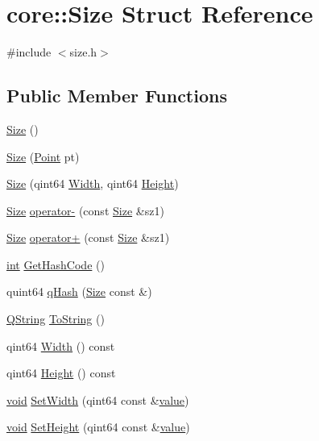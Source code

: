 \hypertarget{structcore_1_1_size}{\section{core\-:\-:Size Struct Reference}
\label{structcore_1_1_size}
}


{\ttfamily \#include $<$size.\-h$>$}

\subsection*{Public Member Functions}
\begin{DoxyCompactItemize}
\item 
\hyperlink{group___o_p_map_widget_gaf57b3247af9a9399f85615e6ad8a6981}{Size} ()
\item 
\hyperlink{group___o_p_map_widget_ga03e339782ac393b92ad72e1d850589f6}{Size} (\hyperlink{structcore_1_1_point}{Point} pt)
\item 
\hyperlink{group___o_p_map_widget_gab8baf4ac21066099566fc15ba5f9542d}{Size} (qint64 \hyperlink{group___o_p_map_widget_ga57df26ac2174659d7a906e8d31a34080}{Width}, qint64 \hyperlink{group___o_p_map_widget_ga9c12f3b98a93a81fab566f35d93c7d20}{Height})
\item 
\hyperlink{structcore_1_1_size}{Size} \hyperlink{group___o_p_map_widget_ga5d0fdc38eda28a8c6bb71c421cb18150}{operator-\/} (const \hyperlink{structcore_1_1_size}{Size} \&sz1)
\item 
\hyperlink{structcore_1_1_size}{Size} \hyperlink{group___o_p_map_widget_gacede8c8f61fa4e8ab03f0780af61b66b}{operator+} (const \hyperlink{structcore_1_1_size}{Size} \&sz1)
\item 
\hyperlink{ioapi_8h_a787fa3cf048117ba7123753c1e74fcd6}{int} \hyperlink{group___o_p_map_widget_ga8e9b3c1ccd7f2e2d5a6f9c4767c06043}{Get\-Hash\-Code} ()
\item 
quint64 \hyperlink{group___o_p_map_widget_ga1f7482f21c86bc1b02f1e6d8ab2de12c}{q\-Hash} (\hyperlink{structcore_1_1_size}{Size} const \&)
\item 
\hyperlink{group___u_a_v_objects_plugin_gab9d252f49c333c94a72f97ce3105a32d}{Q\-String} \hyperlink{group___o_p_map_widget_ga69bf932485cc775bf1cd98d26961ebab}{To\-String} ()
\item 
qint64 \hyperlink{group___o_p_map_widget_ga57df26ac2174659d7a906e8d31a34080}{Width} () const 
\item 
qint64 \hyperlink{group___o_p_map_widget_ga9c12f3b98a93a81fab566f35d93c7d20}{Height} () const 
\item 
\hyperlink{group___u_a_v_objects_plugin_ga444cf2ff3f0ecbe028adce838d373f5c}{void} \hyperlink{group___o_p_map_widget_gae28441c62e671e06cff1065e13176f33}{Set\-Width} (qint64 const \&\hyperlink{glext_8h_aa0e2e9cea7f208d28acda0480144beb0}{value})
\item 
\hyperlink{group___u_a_v_objects_plugin_ga444cf2ff3f0ecbe028adce838d373f5c}{void} \hyperlink{group___o_p_map_widget_gaeb60d897c19a5a111737e862c17dadbd}{Set\-Height} (qint64 const \&\hyperlink{glext_8h_aa0e2e9cea7f208d28acda0480144beb0}{value})
\end{DoxyCompactItemize}
